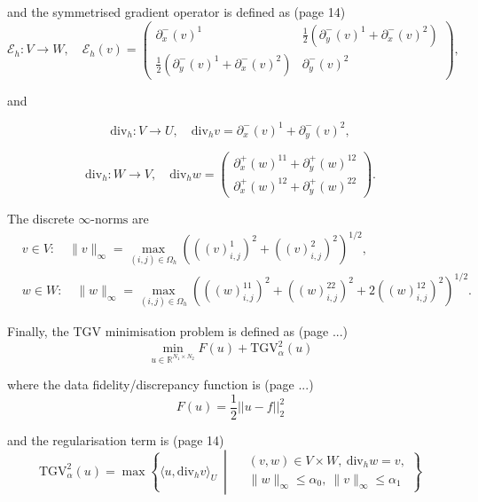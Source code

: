 \documentclass{article}
\begin{document}
and the symmetrised gradient operator is defined as (page 14)
\begin{equation}
    \mathcal{E}_h : V \rightarrow W, \quad \mathcal{E}_h (v) = 
    \begin{pmatrix}
    \partial_x^- (v)^1 &
    \frac{1}{2} \left( \partial_y^- (v)^1 + \partial_x^- (v)^2 \right) \\
    \frac{1}{2} \left( \partial_y^- (v)^1 + \partial_x^- (v)^2 \right) &
    \partial_y^- (v)^2
    \end{pmatrix},
\end{equation}

and


\begin{equation}
\mathrm{div}_h : V \rightarrow U, \quad \mathrm{div}_h v = \partial_x^- (v)^1 + \partial_y^- (v)^2,
\end{equation}

\begin{equation}
\mathrm{div}_h : W \rightarrow V, \quad \mathrm{div}_h w = 
\begin{pmatrix}
\partial_x^+ (w)^{11} + \partial_y^+ (w)^{12} \\
\partial_x^+ (w)^{12} + \partial_y^+ (w)^{22}
\end{pmatrix}.
\end{equation}

The discrete $\infty\text{-norms}$ are
\begin{equation}
    \begin{aligned}
    & v \in V : \quad \|v\|_\infty = \max_{(i,j) \in \Omega_h} \left( \left( (v)_{i,j}^1 \right)^2 + \left( (v)_{i,j}^2 \right)^2 \right)^{1/2}, \\
    & w \in W : \quad \|w\|_\infty = \max_{(i,j) \in \Omega_h} \left( \left( (w)_{i,j}^{11} \right)^2 + \left( (w)_{i,j}^{22} \right)^2 + 2 \left( (w)_{i,j}^{12} \right)^2 \right)^{1/2}.
\end{aligned}
\end{equation}


Finally, the TGV minimisation problem
is defined as (page ...)
\begin{equation}
    \min_{u \in \mathbb{R}^{N_1 \times N_2}} F(u) + \mathrm{TGV}^2_\alpha(u)
\end{equation}

where
the data fidelity/discrepancy function is (page ...)
\begin{equation}
    F(u) = \frac{1}{2} || u - f ||^2_2
\end{equation}

and
the regularisation term is (page 14)
\begin{equation}
    \mathrm{TGV}^2_\alpha(u) = \max \left\{ \langle u, \mathrm{div}_h v \rangle_U \ \middle| \ 
    \begin{aligned}
    &(v, w) \in V \times W, \ \mathrm{div}_h w = v, \\
    &\|w\|_\infty \leq \alpha_0, \ \|v\|_\infty \leq \alpha_1 
    \end{aligned}
    \right\}
\end{equation}
\end{document}
